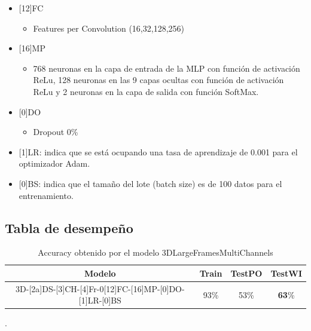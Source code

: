 \begin{onehalfspacing}
\begin{itemize}
    \item {[12]FC}
        \begin{itemize}
            \item Features per Convolution (16,32,128,256)
    \end{itemize}
    
    \item {[16]MP}
        \begin{itemize}
            \item 768 neuronas en la capa de entrada de la MLP con función de activación ReLu, 128 neuronas en las 9 capas ocultas con función de activación ReLu y 2 neuronas en la capa de salida con función SoftMax.
    \end{itemize}
    
    \item {[0]DO}
        \begin{itemize}
            \item Dropout 0\%
    \end{itemize}
    
    \item {[1]LR}: indica que se está ocupando una tasa de aprendizaje de 0.001 para el optimizador Adam.
    
     \item {[0]BS}: indica que el tamaño del lote (batch size) es de 100 datos para el entrenamiento.

\end{itemize}

\subsection{Tabla de desempeño}
\label{sec:TablaDesempeno}

\begin{table}[th]
\centering
    \begin{tabular}{|c|c|c|c|}
        \hline 
        Modelo & Train & TestPO & TestWI\tabularnewline
        \hline 
        \hline 
        3D-{[}2a{]}DS-{[}3{]}CH-{[}4{]}Fr-0{[}12{]}FC-{[}16{]}MP-{[}0{]}DO-[1]LR-[0]BS & 93\% & 53\% & \textbf{63}\%\tabularnewline
        \hline 
    \end{tabular}
    \caption{Accuracy obtenido por el modelo 3DLargeFramesMultiChannels}.
    \label{tab:TDesempeno3DLargeFramesMultiChannels}
\end{table}


\end{onehalfspacing}
